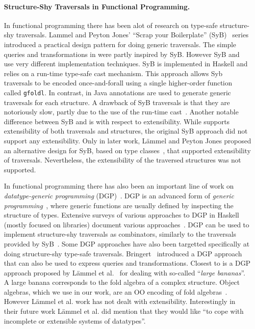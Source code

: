 \paragraph{Structure-Shy Traversals in Functional Programming.}

In
functional programming there has been alot of research on type-safe
structure-shy traversals. Lammel and Peyton Jones' ``Scrap your
Boilerplate'' (SyB)~\cite{ralf03syb,lammel04syb,lammel05syb} series
introduced a practical design pattern for doing generic
traversals. The simple queries and transformations in
\name were partly inspired by SyB. However SyB and \name use very
different implementation techniques. SyB is implemented in Haskell and
relies on a run-time type-safe cast mechanism. This approach allows
Syb traversals to be encoded once-and-forall using a single
higher-order function called \lstinline{gfoldl}. In contrast, in \name
Java annotations are used to generate generic traversals for each
structure. A drawback of SyB traversals is that they are notoriously
slow, partly due to the use of the run-time
cast~\cite{adams2012tyb}. Another notable difference between SyB and
\name is with respect to extensibility. While \name supports
extensibility of both traversals and structures, the original SyB
approach did not support any extensibility. Only in later work,
L\"ammel and Peyton Jones proposed an alternative design for SyB,
based on type classes~\cite{wadler89type-classes}, that supported
extensibility of traversals. Nevertheless, the extensibility of the
traversed structures was not supported.

In functional programming there has also been an important line of
work on \emph{datatype-generic programming} (DGP)~\cite{Gibbons07dgp}.  DGP is an
advanced form of \emph{generic programming}~\cite{GP}, where generic
functions are usually defined by inspecting the structure of
types.  Extensive surveys of various approaches to DGP in Haskell
(mostly focused on libraries) document various
approaches~\cite{ComparingGPHaskellRodriquez,ComparingGPHaskellHinze}.
DGP can be used to implement structure-shy traversals as combinators,
similarly to the traversals provided by SyB~\cite{hinze2003fun}. 
Some DGP approaches have also been targetted specifically at doing 
structure-shy type-safe traversals. Bringert~\cite{bjorn08acf}
introduced a DGP approach that can also be used to express queries 
and transformations. Closest to \name is a DGP approach proposed by 
L\"ammel et al.~\cite{lammel00dealing} for dealing with so-called
``\emph{large bananas}''. A large banana corresponds to the fold
algebra of a complex structure. Object algebras, which we use in our 
work, are an OO encoding of fold algebras~\cite{Oliveira08visitor,bruno12oa}.
However L\"ammel et al. work has not dealt with extensibility. Interestingly 
in their future work  L\"ammel et al. did mention that they would like ``to cope 
with incomplete or extensible systems of datatypes''. 

